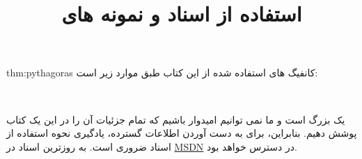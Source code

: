 \begin{theo}{thm:pythagoras}
    \large
    کانفیگ های استفاده شده از این کتاب طبق موارد زیر است:
\end{theo}

\newpage
\title{
    \LARGE
    \textbf{استفاده از اسناد  و نمونه های }
}
\\[25pt] %
{\large
{} یک  بزرگ است و ما نمی توانیم امیدوار باشیم که تمام جزئیات آن را در این یک کتاب پوشش دهیم.
بنابراین، برای به دست آوردن اطلاعات گسترده، یادگیری نحوه استفاده از اسناد  ضروری است.
به روزترین اسناد در \href{https://msdn.microsoft.com/en-us/library/windows/desktop/dn899121%28v=vs.85%29.aspx}{MSDN}
در دسترس خواهد بود.

}
